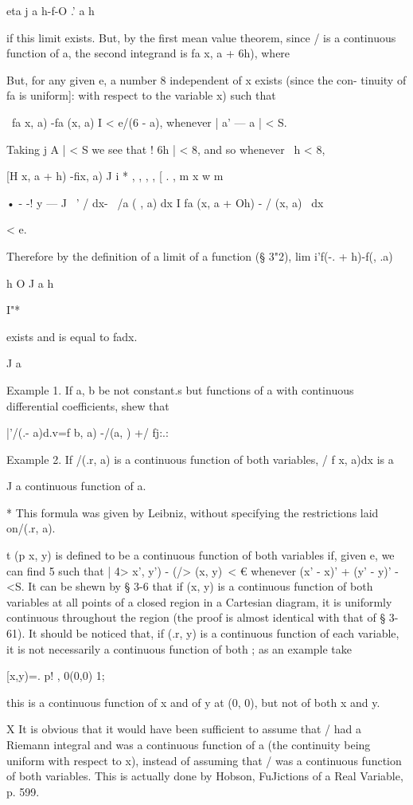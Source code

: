 eta j a h-f-O .' a h

if this limit exists. But, by the first mean value theorem, since / is
a continuous function of a, the second integrand is fa x, a + 6h),
where

But, for any given e, a number 8 independent of x exists (since the
con- tinuity of fa is uniform]: with respect to the variable x) such
that

\ fa x, a) -fa (x, a) I < e/(6 - a), whenever | a' — a | < S.

Taking j A | < S we see that ! 6h | < 8, and so whenever \ h < 8,

[H x, a + h) -fix, a) J i * , , , , [ . , m x w m

• - -! y — J \ ' / dx- \ /a ( , a) dx I fa (x, a + Oh) - / (x, a) \ dx

< e.

Therefore by the definition of a limit of a function (§ 3"2), lim
i'f(-. + h)-f(, .a)

h O J a h

I"*

exists and is equal to fadx.

J a

Example 1. If a, b be not constant.s but functions of a with
continuous differential coefficients, shew that

 |'/(.- a)d.v=f b, a) -/(a, ) +/ fj:.:

Example 2. If /(.r, a) is a continuous function of both variables, / f
x, a)dx is a

J a continuous function of a.

* This formula was given by Leibniz, without specifying the
restrictions laid on/(.r, a).

t (p x, y) is defined to be a continuous function of both variables
if, given e, we can find 5 such that | 4> x', y') - (/> (x, y)\ < €
whenever (x' - x)' + (y' - y)' -<S. It can be shewn by § 3-6 that if
(x, y) is a continuous function of both variables at all points of a
closed region in a Cartesian diagram, it is uniformly continuous
throughout the region (the proof is almost identical with that of §
3-61). It should be noticed that, if (.r, y) is a continuous function
of each variable, it is not necessarily a continuous function of both
; as an example take

 [x,y)=. p! , 0(0,0) 1;

this is a continuous function of x and of y at (0, 0), but not of both
x and y.

X It is obvious that it would have been sufficient to assume that /
had a Riemann integral and was a continuous function of a (the
continuity being uniform with respect to x), instead of assuming that
/ was a continuous function of both variables. This is actually done
by Hobson, FuJictions of a Real Variable, p. 599.

